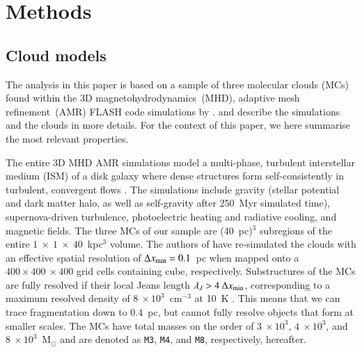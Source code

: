 \section{Methods}\label{methods}


\subsection{Cloud models}\label{methods:clouds}


The analysis in this paper is based on a sample of three molecular clouds (MCs) found within the 3D magnetohydrodynamics~(MHD), adaptive mesh refinement~(AMR) FLASH code \citep{Fryxell2000} simulations by \citet{IbanezMejia2016}.
\citet[hereafter  and , respectively]{IbanezMejia2016,IbanezMejia2017} and \citet[hereafter ]{Chira2017} describe the simulations and the clouds in more details. 
For the context of this paper, we here summarise the most relevant properties. 

The entire 3D MHD AMR simulations model a multi-phase, turbulent interstellar medium (ISM) of a disk galaxy where dense structures form self-consistently in turbulent, convergent flows . 
The simulations include gravity (stellar potential and dark matter halo, as well as self-gravity after 250~Myr simulated time), supernova-driven turbulence, photoelectric heating and radiative cooling, and magnetic fields. 
The three MCs of our sample are (40~pc)$^{3}$ subregions of the entire $1~\times~1~\times~40$~kpc$^3$ volume.
The authors of  have re-simulated the clouds with an effective spatial resolution of $\Delta x_{\rm min}=0.1$~pc when mapped onto a $400\times 400~\times 400$ grid cells containing cube, respectively.
Substructures of the MCs are fully resolved if their local Jeans length $\lambda_J > 4~\Delta x_{\rm min}$, corresponding to a maximum resolved density of $8~\times 10^3$~cm$^{-3}$ at 10~K .
This means that we can trace fragmentation down to 0.4~pc, but cannot fully resolve objects that form at smaller scales.
The MCs have total masses on the order of $3~\times 10^3$, $4~\times 10^3$, and $8~\times 10^3$~M$_{\odot}$ and are denoted as \texttt{M3}, \texttt{M4}, and \texttt{M8}, respectively, hereafter.

